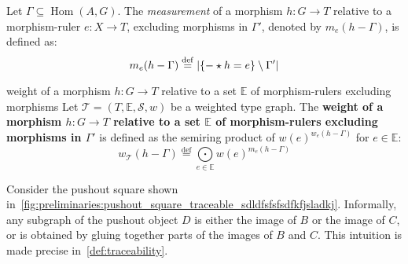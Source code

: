 \begin{definition}
    \label{def:weight_excluding_pre}
    Let \( \Gamma \subseteq \operatorname{Hom}(A, G) \).
    The \emph{measurement} of a morphism \( h:G \to T \) relative to a morphism-ruler \( e: X \to T \), excluding morphisms in \( \Gamma' \), denoted by $m_e(h-\Gamma)$, is defined as:
    \[
        m_e(h-\Gamma) \overset{\operatorname{def}}{=} 
            |\{- \star h = e\} \setminus \Gamma'|
    \]
\end{definition}
\begin{definition}
    \label{def:weight_excluding}
    weight of a morphism $h: G \to T$ relative to a set $\mathbb{E}$ of morphism-rulers excluding morphisms
    Let $\mathcal{T}=(T,\mathbb{E},\mathcal{S},w)$ be a weighted type graph. The \textbf{weight of a morphism $h: G \to T$ relative to a set $\mathbb{E}$ of morphism-rulers excluding morphisms in \( \Gamma' \)} is defined as the semiring product of $w(e)^{w_e(h-\Gamma)}$ for $e \in \mathbb{E}$:
    \[ 
        w_\mathcal{T}(h-\Gamma) \overset{\operatorname{def}}{=} \underset{e \in \mathbb{E}}{\bigodot} 
    w(e)^{m_e(h-\Gamma)}
            \]
\end{definition}
Consider the pushout square shown in~\autoref{fig:preliminaries:pushout_square_traceable_sdldfsfsfsdfkfjsladkj}. Informally, any subgraph of the pushout object \(D\) is either the image of \(B\) or the image of \(C\), or is obtained by gluing together parts of the images of \(B\) and \(C\). This intuition is made precise in~\autoref{def:traceability}.
\begin{figure}[H]
    \centering
    \caption{}
    \label{fig:preliminaries:pushout_square_traceable_sdldfsfsfsdfkfjsladkj}
\end{figure}

